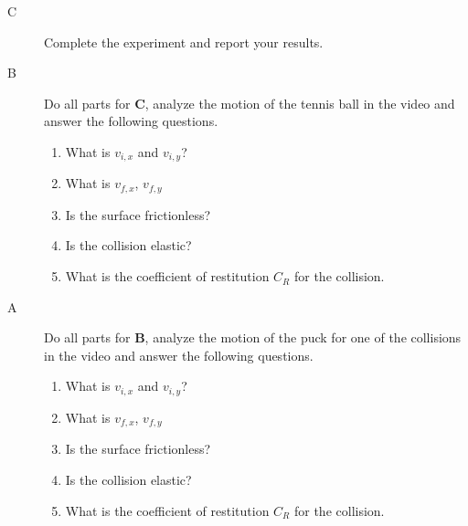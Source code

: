 \report

\begin{description}

\item[C]  Complete the experiment and report your results.

\item[B] Do all parts for {\bf C}, analyze the motion of the tennis ball in the video  and answer the following questions.

\begin{enumerate}
 \item What is $v_{i,x}$ and $v_{i,y}$?
 \item What is $v_{f,x}$, $v_{f,y}$
 \item Is the surface frictionless?
 \item Is the collision elastic?
 \item What is the coefficient of restitution $C_R$ for the collision.
\end{enumerate}

\item[A] Do all parts for {\bf B}, analyze the motion of the puck for one of the collisions in the video and answer the following questions.
\begin{enumerate}
 \item What is $v_{i,x}$ and $v_{i,y}$?
 \item What is $v_{f,x}$, $v_{f,y}$
 \item Is the surface frictionless?
 \item Is the collision elastic?
 \item What is the coefficient of restitution $C_R$ for the collision.
\end{enumerate}
\end{description}


